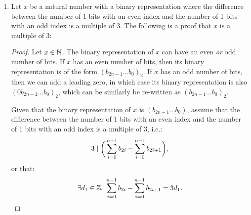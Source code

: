 \documentclass[12pt]{article}
\theoremstyle{definition}
\begin{document}
\begin{enumerate}
\begin{proof}
\begin{align*}
                &= 3d + \big(b_{2m+1}2^{2m+1} - b_{2m+1}2\big) + \big(b_{2m}2^{2m} - b_{2m}2^{0}\big) \tag{by Inductive Hypothesis} \\ 
                &= 3d + 2b_{2m+1}(4^{m} - 1) + b_{2m} (4^m - 1)  \\
                &= 3d + 2b_{2m+1}(3y) + b_{2m} (3y) \tag{using the given hint} \\
                &= 3(d + 2y \cdot b_{2m+1} + y \cdot b_{2m}) \tag{Factoring out 3}\\
                &= 3d_2
            \end{align*}
        \end{proof}
    
    \newcommand{\sm}[1]{\sum_{i=0}^{#1n-1}}
    \newcommand{\fb}[1]{(b_{#1} \dots b_0)_2}
    \newcommand{\mb}[2]{(b_{#1} b_{#2})_2}
    \newcommand{\mbb}[4]{(b_#1 \cdot 2^#2 + b_#3 \cdot 2^#4)}
    \item Let $x$ be a natural number with a binary representation where the difference between the number of 1 bits with an even index and the number of 1 bits with an odd index is a multiple of 3. The following is a proof that $x$ is a multiple of 3:
        
        \begin{proof}
            Let $x \in \mathbb N$. The binary representation of $x$ can have an even \emph{or} odd number of bits.
            If $x$ has an even number of bits, then its binary representation is of the form $(b_{2n-1} \dots b_0)_2$.
            If $x$ has an odd number of bits, then we can add a leading zero, in which case its binary representation is also $(0 b_{2n-2} \dots b_0)_2$, which can be similarly be re-written as $(b_{2n-1} \dots b_0)_2$.
            
            Given that the binary representation of $x$ is $(b_{2n-1} \dots b_0)$, assume that the difference between the number of 1 bits with an even index and the number of 1 bits with an odd index is a multiple of 3, i.e.:
            \begin{align*}
                3 \DIV \bigg(\sm{}b_{2i} - \sm{}b_{2i+1} \bigg),
            \end{align*}
            or that:
            \begin{align*}
                \exists d_1 \in \Z,\ \sm{}b_{2i} - \sm{}b_{2i+1} = 3d_1.
            \end{align*}
            

\end{proof}
\end{enumerate}
\end{document}
